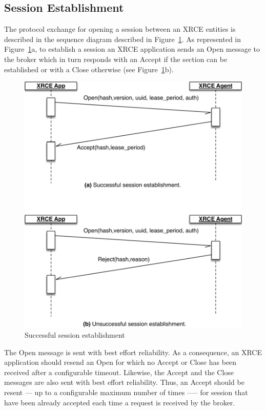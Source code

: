 \documentclass[a4paper,oneside,article]{memoir}
\begin{document}
\subsection{Session Establishment}

The protocol exchange for opening a session between an XRCE entities is described in the sequence
diagram described in Figure~\ref{fig:open-session}.  As represented in
Figure~\ref{fig:open-session}a, to establish a session an XRCE application sends an Open message to
the broker which in turn responds with an Accept if the section can be established or with a Close
otherwise (see Figure~\ref{fig:open-session}b).

\begin{figure}
\centering
\includegraphics[scale=0.6]{open-session.pdf}
\caption{Successful session establishment}\label{fig:open-session}
\end{figure}

The Open message is sent with best effort reliability.  As a consequence, an XRCE application should
resend an Open for which no Accept or Close has been received after a configurable timeout.
Likewise, the Accept and the Close messages are also sent with best effort reliability.  Thus, an
Accept should be resent --- up to a configurable maximum number of times --— for session that have
been already accepted each time a request is received by the broker.
\end{document}
